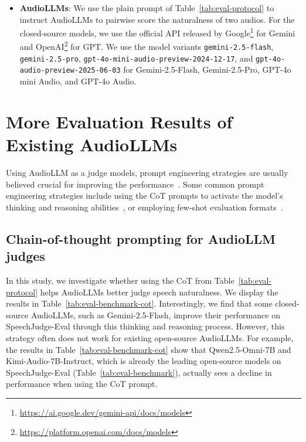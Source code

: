 \documentclass[]{bytedance_seed}
\begin{document}
\begin{itemize}[itemsep=1ex,leftmargin=3ex]
    \item \textbf{AudioLLMs}: We use the plain prompt of Table~\ref{tab:eval-protocol} to instruct AudioLLMs to pairwise score the naturalness of two audios. For the closed-source models, we use the official API released by Google\footnote{\href{https://ai.google.dev/gemini-api/docs/models}{https://ai.google.dev/gemini-api/docs/models}} for Gemini and OpenAI\footnote{\href{https://platform.openai.com/docs/models}{https://platform.openai.com/docs/models}} for GPT. We use the model variants \texttt{gemini-2.5-flash}, \texttt{gemini-2.5-pro}, \texttt{gpt-4o-mini-audio-preview-2024-12-17}, and \texttt{gpt-4o-audio-preview-2025-06-03} for Gemini-2.5-Flash, Gemini-2.5-Pro, GPT-4o mini Audio, and GPT-4o Audio.
\end{itemize}

\section{More Evaluation Results of Existing AudioLLMs}\label{app:more-results-of-audiollm-benchmark}


Using AudioLLM as a judge models, prompt engineering strategies are usually believed crucial for improving the performance~\citep{llm-as-a-judge,audiojudge}. Some common prompt engineering strategies include using the CoT prompts to activate the model's thinking and reasoning abilities~\citep{google-grm,deepseek-grm,audiojudge}, or employing few-shot evaluation formats~\citep{llm-as-a-judge,mimoaudio}.

\subsection{Chain-of-thought prompting for AudioLLM judges}\label{app:cot-prompt}


In this study, we investigate whether using the CoT from Table~\ref{tab:eval-protocol} helps AudioLLMs better judge speech naturalness. We display the results in Table~\ref{tab:eval-benchmark-cot}. Interestingly, we find that some closed-source AudioLLMs, such as Gemini-2.5-Flash, improve their performance on SpeechJudge-Eval through this thinking and reasoning process. However, this strategy often does not work for existing open-source AudioLLMs. For example, the results in Table~\ref{tab:eval-benchmark-cot} show that {Qwen2.5-Omni-7B} and Kimi-Audio-7B-Instruct, which is already the leading open-source models on SpeechJudge-Eval (Table~\ref{tab:eval-benchmark}), actually sees a decline in performance when using the CoT prompt.
\end{document}
